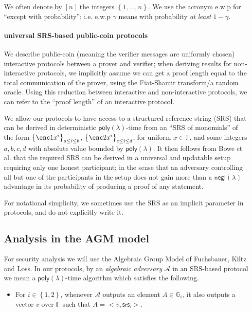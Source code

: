 \documentclass[11pt]{article} %
\newcommand{\Gi}{\ensuremath{{\mathbb G}_i}\xspace}
\newcommand{\F}{\ensuremath{\mathbb F}\xspace}
\newcommand{\adv}{\ensuremath{\mathcal A}\xspace}
\newcommand{\srsi}{\ensuremath{\mathsf{srs_i}}\xspace}
\newcommand{\negl}{\ensuremath{\mathsf{negl}(\lambda)}\xspace}
\newcommand{\sett}[2]{\ensuremath{\set{#1}_{#2}}\xspace}
\newcommand{\set}[1]{\ensuremath{\left\{#1\right\}}\xspace}
\newcommand{\obgen}{\ensuremath{\mathcal O}\xspace}
\newcommand{\poly}{\ensuremath{\mathsf{poly(\lambda)}}\xspace}
\begin{document}
We often denote by $[n]$ the integers \set{1,\ldots,n}.
We use the acronym e.w.p for ``except with probability''; i.e. e.w.p $\gamma$ means with probability \emph{at least} $1-\gamma$.

\paragraph{universal SRS-based public-coin protocols}
We describe public-coin (meaning the verifier messages are uniformly chosen) interactive protocols between a prover and verifier; when deriving results for non-interactive protocols, we implicitly assume we can get a proof length equal to the total communication of the prover, using the Fiat-Shamir transform/a random oracle. Using this reduction between interactive and non-interactive protocols, we can refer to the ``proof length'' of an interactive protocol. 

We allow our protocols to have access to a structured reference string (SRS) that can be derived in deterministic \poly-time from an ``SRS of monomials'' of the form
\sett{\enc1{x^i}}{a\leq i \leq b}, \sett{\enc2{x^i}}{c\leq i \leq d}, for uniform $x\in \F$,
and some integers $a,b,c,d$ with absolute value bounded by \poly.
It then follows from Bowe et al. \cite{SecondMPC} that the required SRS can be derived in a universal and updatable setup requiring only one honest participant; in the sense that an adversary controlling all but one of the participants in the setup does not gain more than a \negl advantage in its probability of producing a proof of any statement.

For notational simplicity, we sometimes use the SRS  as an implicit parameter in protocols, and do not explicitly write it.

\subsection{Analysis in the AGM model}\label{subsec:AGM}
For security analysis we will use the Algebraic Group Model of Fuchsbauer, Kiltz and Loss\cite{AGM}.
In our protocols, by an \emph{algebraic adversary} \adv in an SRS-based protocol we mean a \poly-time algorithm which satisfies the following.
\begin{itemize}
 \item For $i\in \set{1,2}$, whenever \adv outputs an element $A\in \Gi$, it also outputs a vector $v$ over \F such that $A = <v,\srsi>$.
\end{itemize}
\end{document}
